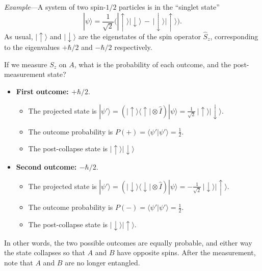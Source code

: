 \documentclass[pra,12pt]{revtex4-2}
\begin{document}
\begin{framed}
\noindent
\textit{Example}---A system of two spin-$1/2$ particles is in
the ``singlet state''
\begin{equation}
  |\psi\rangle = \frac{1}{\sqrt{2}} \Big(|\!\uparrow\rangle|\!\downarrow\rangle \,-\, |\!\downarrow\rangle|\!\uparrow\rangle\Big).
\end{equation}
As usual, $|\!\uparrow\rangle$ and $|\!\downarrow\rangle$ are the
eigenstates of the spin operator $\hat{S}_z$, corresponding to the
eigenvalues $+\hbar/2$ and $-\hbar/2$ respectively.

If we measure $S_z$ on $A$, what is the probability of each outcome,
and the post-measurement state?

\begin{itemize}
\item \textbf{First outcome: $+\hbar/2$}.
  \begin{itemize}
  \item The projected state is $\displaystyle |\psi'\rangle = \left(|\!\uparrow\rangle\langle\uparrow| \otimes \hat{I}\right)|\psi\rangle = 
    \frac{1}{\sqrt{2}}\,|\!\uparrow\rangle|\!\downarrow\rangle$.
  \item The outcome probability is $\displaystyle
    P(+) = \langle \psi'|\psi'\rangle = \frac{1}{2}$.
  \item The post-collapse state is $\displaystyle |\!\uparrow\rangle |\!\downarrow\rangle$
  \end{itemize}

\item \textbf{Second outcome: $-\hbar/2$}.
  \begin{itemize}
  \item The projected state is $\displaystyle |\psi'\rangle = \left(|\!\downarrow\rangle\langle\downarrow| \otimes \hat{I}\right)|\psi\rangle = 
    -\frac{1}{\sqrt{2}}\,|\!\downarrow\rangle|\!\uparrow\rangle$.
  \item The outcome probability is $\displaystyle P(-) = \langle \psi'|\psi'\rangle =
    \frac{1}{2}$.
  \item The post-collapse state is $\displaystyle |\!\downarrow\rangle |\!\uparrow\rangle$.
  \end{itemize}
\end{itemize}
In other words, the two possible outcomes are equally probable, and
either way the state collapses so that $A$ and $B$ have opposite
spins.  After the measurement, note that $A$ and $B$ are no longer
entangled.
\end{framed}
\end{document}
